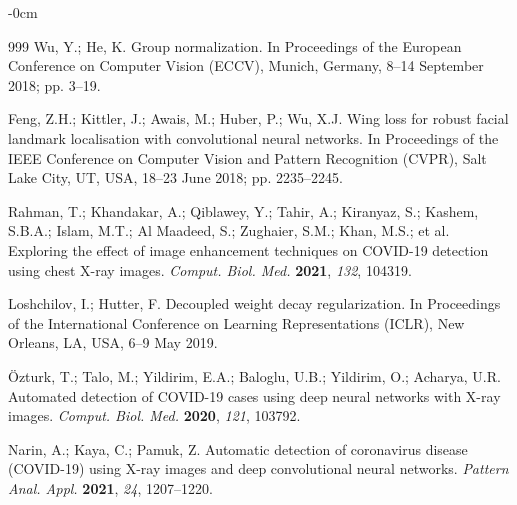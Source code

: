 \documentclass[applsci,article,submit,pdftex,moreauthors]{Definitions/mdpi}
\begin{document}
\begin{adjustwidth}{-\extralength}{0cm}
\begin{thebibliography}{999}
Wu, Y.; He, K. Group normalization. In Proceedings of the European Conference on Computer Vision (ECCV), Munich, Germany, 8--14 September 2018; pp. 3--19.

Feng, Z.H.; Kittler, J.; Awais, M.; Huber, P.; Wu, X.J. Wing loss for robust facial landmark localisation with convolutional neural networks. In Proceedings of the IEEE Conference on Computer Vision and Pattern Recognition (CVPR), Salt Lake City, UT, USA, 18--23 June 2018; pp. 2235--2245.

Rahman, T.; Khandakar, A.; Qiblawey, Y.; Tahir, A.; Kiranyaz, S.; Kashem, S.B.A.; Islam, M.T.; Al Maadeed, S.; Zughaier, S.M.; Khan, M.S.; et al. Exploring the effect of image enhancement techniques on COVID-19 detection using chest X-ray images. \textit{Comput. Biol. Med.} \textbf{2021}, \textit{132}, 104319.

Loshchilov, I.; Hutter, F. Decoupled weight decay regularization. In Proceedings of the International Conference on Learning Representations (ICLR), New Orleans, LA, USA, 6--9 May 2019.

\"Ozturk, T.; Talo, M.; Yildirim, E.A.; Baloglu, U.B.; Yildirim, O.; Acharya, U.R. Automated detection of COVID-19 cases using deep neural networks with X-ray images. \textit{Comput. Biol. Med.} \textbf{2020}, \textit{121}, 103792.

Narin, A.; Kaya, C.; Pamuk, Z. Automatic detection of coronavirus disease (COVID-19) using X-ray images and deep convolutional neural networks. \textit{Pattern Anal. Appl.} \textbf{2021}, \textit{24}, 1207--1220.

\end{thebibliography}

\PublishersNote{}
\end{adjustwidth}
\end{document}

